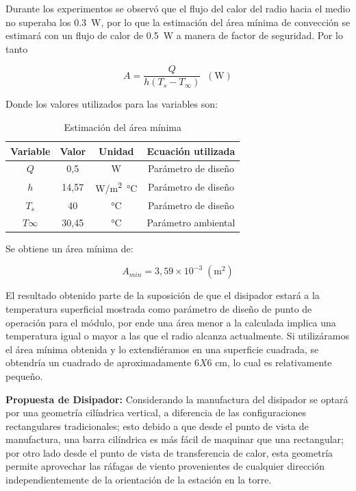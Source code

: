 Durante los experimentos se observó que el flujo del calor del radio hacia el medio no superaba los \SI{0,3}{\watt}, por lo que la estimación del área mínima de convección se estimará con un flujo de calor de \SI{0,5}{\watt} a manera de factor de seguridad. Por lo tanto

\begin{equation}\label{area minima}
    A=\frac{Q}{h(T_{s}-T_{\infty })}\;\;(\si{\watt})
\end{equation}

Donde los valores utilizados para las variables son:

\begin{table}[H]
\centering
\caption{Estimación del área mínima}
\label{calculo20}
\begin{tabular}{cccc}
\toprule
\textbf{Variable} & \textbf{Valor}  & \textbf{Unidad}      & \textbf{Ecuación utilizada} \\ \midrule
$Q$ & 0,5  & \si{\watt} & Parámetro de diseño \\
$h$ & 14,57 & \si{\watt/\square\meter\celsius} & Parámetro de diseño
\\
$T_{s}$ & 40 & \si{\celsius}& Parámetro de diseño\\
$T\infty$ & 30,45 & \si{\celsius} & Parámetro ambiental\\
\bottomrule
\end{tabular}
\end{table}

Se obtiene un área mínima de:

\begin{equation}\label{resultado area}
    A_{min}= 3,59\times 10^{-3}\;(\si{\square\meter})
\end{equation}

El resultado obtenido parte de la suposición de que el disipador estará a la temperatura superficial mostrada como parámetro de diseño de punto de operación para el módulo, por ende una área menor a la calculada implica una temperatura igual o mayor a las que el radio alcanza actualmente. Si utilizáramos el área mínima obtenida y lo extendiéramos en una superficie cuadrada, se obtendría un cuadrado de aproximadamente $6X6$ \si{\centi\meter}, lo cual es relativamente pequeño.

\textbf{Propuesta de Disipador:} Considerando la manufactura del disipador se optará por una geometría cilíndrica vertical, a diferencia de las configuraciones rectangulares tradicionales; esto debido a que desde el punto de vista de manufactura, una barra cilíndrica es más fácil de maquinar que una rectangular; por otro lado desde el punto de vista de transferencia de calor, esta geometría permite aprovechar las ráfagas de viento provenientes de cualquier dirección independientemente de la orientación de la estación en la torre.


